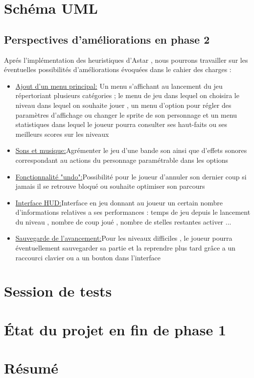 \documentclass{article}
\begin{document}
	\section{Schéma UML}
	\newpage
	\begin{center}
	\section{Perspectives d'améliorations en phase 2}
	\end{center}
	\vspace{1cm}
	 Aprés l'implémentation des heuristiques d'Astar , nous pourrons travailler sur les éventuelles possibilités d'améliorations évoquées dans le cahier des charges :
	 \vspace{0.5cm}
	 \begin{itemize}
	 	\item\underline{Ajout d'un menu principal:} Un menu s'affichant au lancement du jeu répertoriant plusieurs catégories ; le menu de jeu dans lequel on choisira le niveau dans lequel on souhaite jouer , un menu d'option pour régler des paramètres d'affichage ou changer le sprite de son personnage et un menu statistiques dans lequel le joueur pourra consulter ses haut-faits ou ses meilleurs scores sur les niveaux
	 	\vspace{0.5cm}
	 	\item\underline{Sons et musique:}Agrémenter le jeu d'une bande son ainsi que d'effets sonores correspondant au actions du personnage paramétrable  dans les options 
	 	\vspace{0.5cm}
	 	\item\underline{Fonctionnalité "undo":}Possibilité pour le joueur d'annuler son dernier coup si jamais il se retrouve bloqué ou souhaite optimiser son parcours
	 	\vspace{0.5cm}
	 	\item\underline{Interface HUD:}Interface en jeu donnant au joueur un certain nombre d'informations relatives a ses performances : temps de jeu depuis le lancement du niveau , nombre de coup joué , nombre de stelles restantes activer ...
	 	\vspace{0.5cm}
	 	\item\underline{Sauvegarde de l'avancement:}Pour les niveaux difficiles , le joueur pourra éventuellement sauvegarder sa partie et la reprendre plus tard grâce a un raccourci clavier ou a un bouton dans l'interface
	 \end{itemize}
	\newpage
	\section{Session de tests}
	\newpage
	
	\section{État du projet en fin de phase 1}
	\section{Résumé}


		

\newpage
\end{document}
